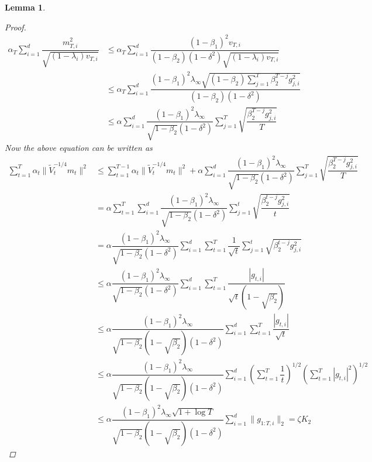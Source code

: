 \documentclass[12pt]{article}
\newtheorem{lem}[thm]{Lemma}%
\begin{document}
\begin{lem}
\begin{proof}
\begin{align*}
    \alpha_{T}\sum_{i=1}^d 
     \dfrac{m_{T,i}^2}{\sqrt{(1-\lambda_{i})v_{T,i}}} 
     &\leq \alpha_{T}\sum_{i=1}^d \dfrac{(1-\beta_{1})^{2}v_{T,i}}{(1-\beta_{2})(1-\delta^2)\sqrt{(1-\lambda_{i})v_{T,i}}}\\
     &\leq \alpha_{T}\sum_{i=1}^{d}\dfrac{(1-\beta_{1})^{2}\lambda_{\infty}\sqrt{(1-\beta_{2})\sum_{j=1}^T{\beta_{2}^{T-j}g_{j,i}^{2}}}}{(1-\beta_{2})(1-\delta^2)} \\
     &\leq \alpha\sum_{i=1}^{d}{\dfrac{(1-\beta_{1})^{2}\lambda_{\infty}}{\sqrt{1-\beta_2}(1-\delta^2)}\sum_{j=1}^{T}{\sqrt{\dfrac{\beta_{2}^{T-j}g_{j,i}^{2}}{T}}}}
\end{align*}
Now the above equation can be written as 
\begin{align*}
    \sum_{t=1}^T{\alpha_{t}\lVert \tilde{V}_{t}^{-1/4}m_{t} \rVert^2} &\leq \sum_{t=1}^{T-1}{\alpha_{t}\lVert \tilde{V}_{t}^{-1/4}m_{t} \rVert^2} + \alpha\sum_{i=1}^{d}{\dfrac{(1-\beta_{1})^{2}\lambda_{\infty}}{\sqrt{1-\beta_2}(1-\delta^2)}\sum_{j=1}^{T}{\sqrt{\dfrac{\beta_{2}^{T-j}g_{j,i}^{2}}{T}}}}\\
    &=  \alpha\sum_{t=1}^{T}{\sum_{i=1}^{d}{\dfrac{(1-\beta_{1})^{2}\lambda_{\infty}}{\sqrt{1-\beta_2}(1-\delta^2)}\sum_{j=1}^{t}{\sqrt{\dfrac{\beta_{2}^{t-j}g_{j,i}^{2}}{t}}}}}\\
    &= \alpha \dfrac{(1-\beta_{1})^{2}\lambda_{\infty}}{\sqrt{1-\beta_2}(1-\delta^2)}\sum_{i=1}^{d}{\sum_{t=1}^{T}\dfrac{1}{\sqrt{t}}{\sum_{j=1}^{t}{\sqrt{\beta_2^{t-j}g_{j,i}^{2}}}}} \\
     &\leq \alpha \dfrac{(1-\beta_{1})^{2}\lambda_{\infty}}{\sqrt{1-\beta_2}(1-\delta^2)}\sum_{i=1}^{d}{\sum_{t=1}^{T}{\dfrac{|g_{t,i}|}{\sqrt{t}(1-\sqrt{\beta_{2}})}}}\\
    &\leq \alpha \dfrac{(1-\beta_{1})^{2}\lambda_{\infty}}{\sqrt{1-\beta_2}(1-\sqrt{\beta_{2}})(1-\delta^2)}\sum_{i=1}^{d}{\sum_{t=1}^{T}{\dfrac{|g_{t,i}|}{\sqrt{t}}}}\\
    &\leq \alpha \dfrac{(1-\beta_{1})^{2}\lambda_{\infty}}{\sqrt{1-\beta_2}(1-\sqrt{\beta_{2}})(1-\delta^2)}\sum_{i=1}^{d}{(\sum_{t=1}^{T}{\dfrac{1}{t}})^{1/2}(\sum_{t=1}^{T}{|g_{t,i}|^{2}})^{1/2}}\\
    &\leq \alpha \dfrac{(1-\beta_{1})^{2}\lambda_{\infty}\sqrt{1+\log{T}}}{\sqrt{1-\beta_2}(1-\sqrt{\beta_{2}})(1-\delta^2)}\sum_{i=1}^{d}{\lVert g_{1:T,i}\rVert_{2}}=\zeta K_2
\end{align*}
\end{proof}
\end{lem}
\end{document}
